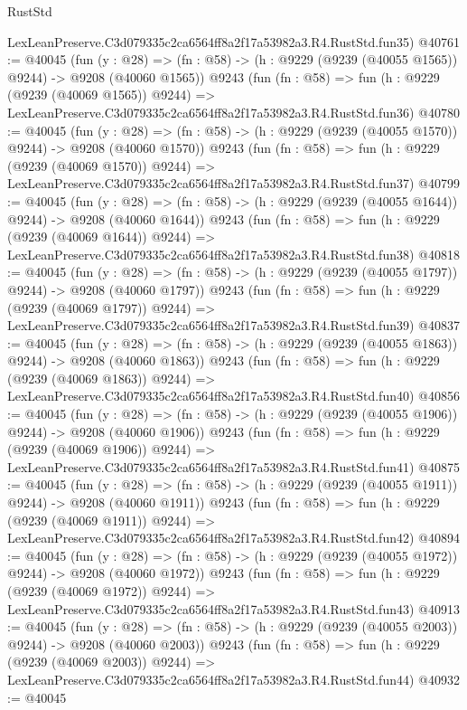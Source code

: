 \begin{lexlean}{RustStd}
\begin{coremodule}
    LexLeanPreserve.C3d079335c2ca6564ff8a2f17a53982a3.R4.RustStd.fun35)
@40761 := @40045
    (fun (y : @28) =>
    (fn : @58) -> (h : @9229 (@9239 (@40055 @1565)) @9244) -> @9208 (@40060 @1565))
    @9243
    (fun (fn : @58) =>
    fun (h : @9229 (@9239 (@40069 @1565)) @9244) =>
    LexLeanPreserve.C3d079335c2ca6564ff8a2f17a53982a3.R4.RustStd.fun36)
@40780 := @40045
    (fun (y : @28) =>
    (fn : @58) -> (h : @9229 (@9239 (@40055 @1570)) @9244) -> @9208 (@40060 @1570))
    @9243
    (fun (fn : @58) =>
    fun (h : @9229 (@9239 (@40069 @1570)) @9244) =>
    LexLeanPreserve.C3d079335c2ca6564ff8a2f17a53982a3.R4.RustStd.fun37)
@40799 := @40045
    (fun (y : @28) =>
    (fn : @58) -> (h : @9229 (@9239 (@40055 @1644)) @9244) -> @9208 (@40060 @1644))
    @9243
    (fun (fn : @58) =>
    fun (h : @9229 (@9239 (@40069 @1644)) @9244) =>
    LexLeanPreserve.C3d079335c2ca6564ff8a2f17a53982a3.R4.RustStd.fun38)
@40818 := @40045
    (fun (y : @28) =>
    (fn : @58) -> (h : @9229 (@9239 (@40055 @1797)) @9244) -> @9208 (@40060 @1797))
    @9243
    (fun (fn : @58) =>
    fun (h : @9229 (@9239 (@40069 @1797)) @9244) =>
    LexLeanPreserve.C3d079335c2ca6564ff8a2f17a53982a3.R4.RustStd.fun39)
@40837 := @40045
    (fun (y : @28) =>
    (fn : @58) -> (h : @9229 (@9239 (@40055 @1863)) @9244) -> @9208 (@40060 @1863))
    @9243
    (fun (fn : @58) =>
    fun (h : @9229 (@9239 (@40069 @1863)) @9244) =>
    LexLeanPreserve.C3d079335c2ca6564ff8a2f17a53982a3.R4.RustStd.fun40)
@40856 := @40045
    (fun (y : @28) =>
    (fn : @58) -> (h : @9229 (@9239 (@40055 @1906)) @9244) -> @9208 (@40060 @1906))
    @9243
    (fun (fn : @58) =>
    fun (h : @9229 (@9239 (@40069 @1906)) @9244) =>
    LexLeanPreserve.C3d079335c2ca6564ff8a2f17a53982a3.R4.RustStd.fun41)
@40875 := @40045
    (fun (y : @28) =>
    (fn : @58) -> (h : @9229 (@9239 (@40055 @1911)) @9244) -> @9208 (@40060 @1911))
    @9243
    (fun (fn : @58) =>
    fun (h : @9229 (@9239 (@40069 @1911)) @9244) =>
    LexLeanPreserve.C3d079335c2ca6564ff8a2f17a53982a3.R4.RustStd.fun42)
@40894 := @40045
    (fun (y : @28) =>
    (fn : @58) -> (h : @9229 (@9239 (@40055 @1972)) @9244) -> @9208 (@40060 @1972))
    @9243
    (fun (fn : @58) =>
    fun (h : @9229 (@9239 (@40069 @1972)) @9244) =>
    LexLeanPreserve.C3d079335c2ca6564ff8a2f17a53982a3.R4.RustStd.fun43)
@40913 := @40045
    (fun (y : @28) =>
    (fn : @58) -> (h : @9229 (@9239 (@40055 @2003)) @9244) -> @9208 (@40060 @2003))
    @9243
    (fun (fn : @58) =>
    fun (h : @9229 (@9239 (@40069 @2003)) @9244) =>
    LexLeanPreserve.C3d079335c2ca6564ff8a2f17a53982a3.R4.RustStd.fun44)
@40932 := @40045

\end{coremodule}
\end{lexlean}
